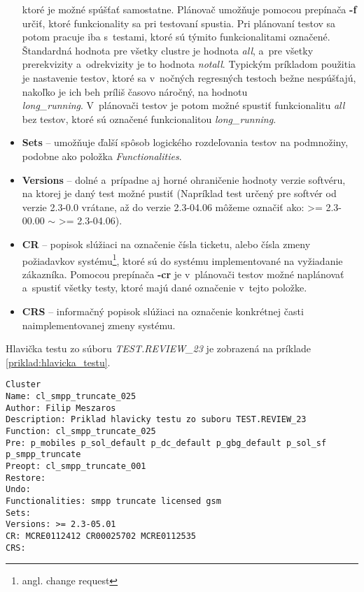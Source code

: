 \begin{itemize}
ktoré je možné spúšťať samostatne. 
Plánovač umožňuje pomocou prepínača \textbf{-f} určiť, ktoré 
funkcionality sa pri testovaní spustia.
Pri plánovaní testov sa potom pracuje iba s~testami, ktoré sú týmito 
funkcionalitami označené.
Štandardná hodnota pre všetky clustre je hodnota \textit{all}, a~pre 
všetky prerekvizity a~odrekvizity je to hodnota \textit{notall}.
Typickým príkladom použitia je nastavenie testov, ktoré sa v~nočných 
regresných testoch bežne nespúšťajú, nakoľko je ich beh príliš časovo náročný, 
na hodnotu \\ \textit{long\_running}.
V~plánovači testov je potom možné spustiť funkcionalitu \textit{all} bez testov, 
ktoré sú označené funkcionalitou \textit{long\_running}.
\item \textbf{Sets} -- umožňuje ďalší spôsob logického rozdeľovania testov 
na podmnožiny, podobne ako položka \textit{Functionalities}.
\item \textbf{Versions} -- dolné a~prípadne aj horné ohraničenie hodnoty 
verzie softvéru, na ktorej je daný test možné pustiť
(Napríklad test určený pre softvér od verzie 2.3-0.0 vrátane, 
až do verzie 2.3-04.06 môžeme označiť ako: \textgreater= 2.3-00.00 
$\sim$ \textgreater= 2.3-04.06).
\item \textbf{CR} -- popisok slúžiaci na označenie čísla ticketu, alebo 
čísla zmeny požiadavkov systému\footnote{angl. change request}, ktoré sú 
do systému implementované na vyžiadanie zákazníka. 
Pomocou prepínača \textbf{-cr} je v~plánovači testov možné naplánovať 
a~spustiť všetky testy, ktoré majú dané označenie v~tejto položke.
\item \textbf{CRS} -- informačný popisok slúžiaci na označenie konkrétnej 
časti naimplementovanej zmeny systému. 
\end{itemize}

Hlavička testu zo súboru \emph{TEST.REVIEW\_23} je zobrazená na 
príklade \ref{priklad:hlavicka_testu}.

\noindent\begin{minipage}{\textwidth}
\begin{lstlisting}[caption=Hlavička testu,label=priklad:hlavicka_testu]
Cluster
Name: cl_smpp_truncate_025
Author: Filip Meszaros
Description: Priklad hlavicky testu zo suboru TEST.REVIEW_23
Function: cl_smpp_truncate_025
Pre: p_mobiles p_sol_default p_dc_default p_gbg_default p_sol_sf p_smpp_truncate
Preopt: cl_smpp_truncate_001
Restore:
Undo:
Functionalities: smpp truncate licensed gsm
Sets:
Versions: >= 2.3-05.01
CR: MCRE0112412 CR00025702 MCRE0112535
CRS:
\end{lstlisting}
\end{minipage}

